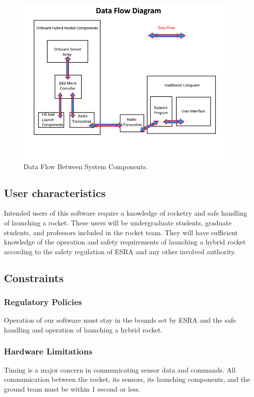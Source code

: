 \documentclass[10pt,draftclsnofoot,onecolumn,compsoc]{IEEEtran}
\begin{document}
\begin{figure}[!ht]
  \caption{Data Flow Between System Components.}
  \centering
	\includegraphics[scale=.85]{RocketBlockDiagram}
\end{figure}
\FloatBarrier
\subsection{ User characteristics}
Intended users of this software require a knowledge of rocketry and safe handling of launching a rocket. These users will be undergraduate students, graduate students, and professors included in the rocket team. They will have sufficient knowledge of the operation and safety requirements of launching a hybrid rocket according to the safety regulation of ESRA and any other involved authority.

\subsection{Constraints}

\subsubsection{\bf  Regulatory Policies}Operation of our software must stay in the bounds set by ESRA and the safe handling and operation of launching a hybrid rocket.  

\subsubsection{\bf Hardware Limitations} Timing is a major concern in communicating sensor data and commands. All communication between the rocket, its sensors, its launching components, and the ground team must be within 1  second or less.
\end{document}
